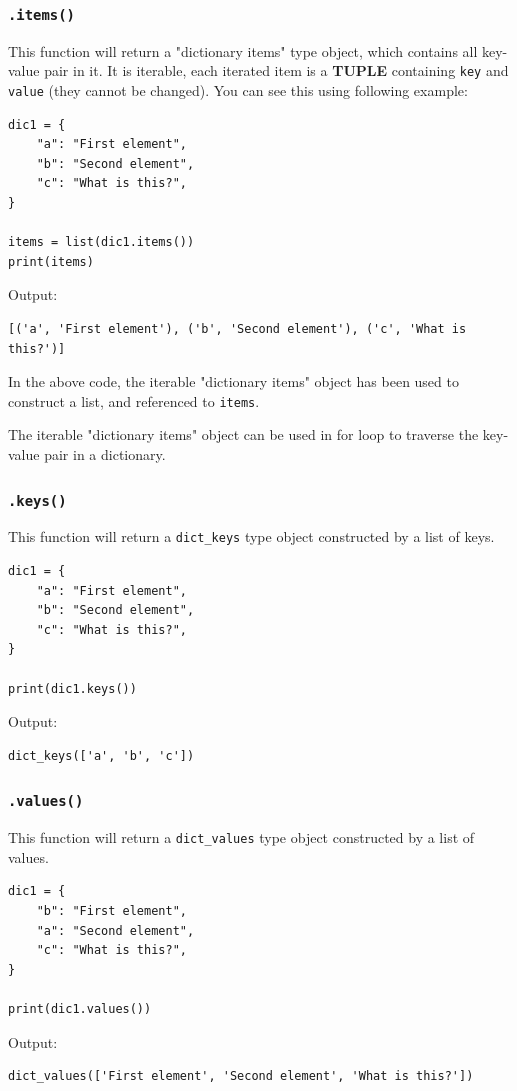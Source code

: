 \documentclass[12pt]{book}
\begin{document}
\subsubsection{\texttt{.items()}}
\label{sec:orgad8cff2}
This function will return a "dictionary items" type object, which contains all key-value pair in it. It is iterable, each iterated item is a \textbf{TUPLE} containing \texttt{key} and \texttt{value} (they cannot be changed). You can see this using following example:
\begin{verbatim}
dic1 = {
    "a": "First element",
    "b": "Second element",
    "c": "What is this?",
}

items = list(dic1.items())
print(items)
\end{verbatim}
Output:
\begin{verbatim}
[('a', 'First element'), ('b', 'Second element'), ('c', 'What is this?')]
\end{verbatim}
In the above code, the iterable "dictionary items" object has been used to construct a list, and referenced to \texttt{items}.

The iterable "dictionary items" object can be used in for loop to traverse the key-value pair in a dictionary.
\subsubsection{\texttt{.keys()}}
\label{sec:org2e1a595}
This function will return a \texttt{dict\_keys} type object constructed by a list of keys.
\begin{verbatim}
dic1 = {
    "a": "First element",
    "b": "Second element",
    "c": "What is this?",
}

print(dic1.keys())
\end{verbatim}
Output:
\begin{verbatim}
dict_keys(['a', 'b', 'c'])
\end{verbatim}
\subsubsection{\texttt{.values()}}
\label{sec:org23ac318}
This function will return a \texttt{dict\_values} type object constructed by a list of values.
\begin{verbatim}
dic1 = {
    "b": "First element",
    "a": "Second element",
    "c": "What is this?",
}

print(dic1.values())
\end{verbatim}
Output:
\begin{verbatim}
dict_values(['First element', 'Second element', 'What is this?'])
\end{verbatim}
\end{document}

